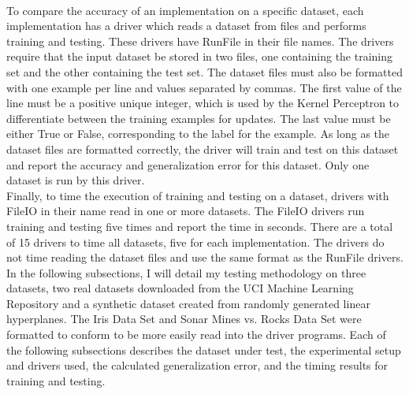 \\To compare the accuracy of an implementation on a specific dataset, each implementation has a driver which reads a dataset from files and performs training and testing. These drivers have RunFile in their file names. The drivers require that the input dataset be stored in two files, one containing the training set and the other containing the test set. The dataset files must also be formatted with one example per line and values separated by commas. The first value of the line must be a positive unique integer, which is used by the Kernel Perceptron to differentiate between the training examples for updates. The last value must be either True or False, corresponding to the label for the example. As long as the dataset files are formatted correctly, the driver will train and test on this dataset and report the accuracy and generalization error for this dataset. Only one dataset is run by this driver.
\\Finally, to time the execution of training and testing on a dataset, drivers with FileIO in their name read in one or more datasets. The FileIO drivers run training and testing five times and report the time in seconds. There are a total of 15 drivers to time all datasets, five for each implementation. The drivers do not time reading the dataset files and use the same format as the RunFile drivers. 
\\In the following subsections, I will detail my testing methodology on three datasets, two real datasets downloaded from the UCI Machine Learning Repository \cite{DG17} and a synthetic dataset created from randomly generated linear hyperplanes. The Iris Data Set \cite{Fis36} and Sonar Mines vs. Rocks Data Set \cite{SG88} were formatted to conform to be more easily read into the driver programs. Each of the following subsections describes the dataset under test, the experimental setup and drivers used, the calculated generalization error, and the timing results for training and testing.
